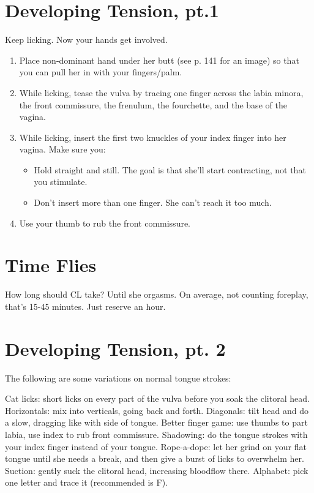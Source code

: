 \section{Developing Tension, pt.1}
\begin{outline}
\1 Keep licking. Now your hands get involved.
\begin{enumerate}
	\item Place non-dominant hand under her butt (see p. 141 for an image) so that you can pull her in with your fingers/palm.
	\item While licking, tease the vulva by tracing one finger across the labia minora, the front commissure, the frenulum, the fourchette, and the base of the vagina.
	\item While licking, insert the first two knuckles of your index finger into her vagina. Make sure you:
	\begin{itemize}
		\item Hold straight and still. The goal is that she'll start contracting, not that you stimulate.
		\item Don't insert more than one finger. She can't reach it too much.
	\end{itemize}
	\item Use your thumb to rub the front commissure.
\end{enumerate}
\end{outline}

\section{Time Flies}
\begin{outline}
\1 How long should CL take? Until she orgasms.
\1 On average, not counting foreplay, that's 15-45 minutes. Just reserve an hour.
\end{outline}

\section{Developing Tension, pt. 2}
The following are some variations on normal tongue strokes:
\begin{outline}
\1 Cat licks: short licks on every part of the vulva before you soak the clitoral head.
\1 Horizontals: mix into verticals, going back and forth.
\1 Diagonals: tilt head and do a slow, dragging like with side of tongue.
\1 Better finger game: use thumbs to part labia, use index to rub front commissure.
\1 Shadowing: do the tongue strokes with your index finger instead of your tongue.
\1 Rope-a-dope: let her grind on your flat tongue until she needs a break, and then give a burst of licks to overwhelm her.
\1 Suction: gently suck the clitoral head, increasing bloodflow there.
\1 Alphabet: pick one letter and trace it (recommended is F).
\end{outline}

